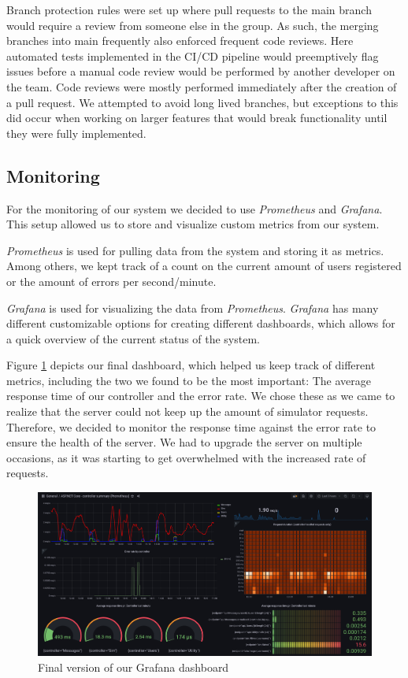 Branch protection rules were set up where pull requests to the main branch would require a review from someone else in the group. As such, the merging branches into main frequently also enforced frequent code reviews. Here automated tests implemented in the CI/CD pipeline would preemptively flag issues before a manual code review would be performed by another developer on the team. Code reviews were mostly performed immediately after the creation of a pull request. We attempted to avoid long lived branches, but exceptions to this did occur when working on larger features that would break functionality until they were fully implemented.

\subsection{Monitoring}


For the monitoring of our system we decided to use \textit{Prometheus} and \textit{Grafana}. This setup allowed us to store and visualize custom metrics from our system.

\textit{Prometheus} is used for pulling data from the system and storing it as metrics. Among others, we kept track of a count on the current amount of users registered or the amount of errors per second/minute.

\textit{Grafana} is used for visualizing the data from \textit{Prometheus}. \textit{Grafana} has many different customizable options for creating different dashboards, which allows for a quick overview of the current status of the system.

Figure \ref{GrafanaDashboard} depicts our final dashboard, which helped us keep track of different metrics, including the two we found to be the most important: The average response time of our controller and the error rate. We chose these as we came to realize that the server could not keep up the amount of simulator requests. Therefore, we decided to monitor the response time against the error rate to ensure the health of the server. We had to upgrade the server on multiple occasions, as it was starting to get overwhelmed with the increased rate of requests. 

\begin{figure}[H]
    \centering
    \includegraphics[width=16cm]{Diagrams/dashboard.png}
    \caption{Final version of our Grafana dashboard}
    \label{GrafanaDashboard}
\end{figure}

